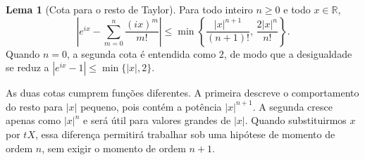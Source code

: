 \documentclass[12pt,portuguese]{article}
\theoremstyle{definition}
\newtheorem{lemma}[lemma]{Lema}
\theoremstyle{plainexercise}
\theoremstyle{starredexercise}
\theoremstyle{definition}
\begin{document}
\begin{lemma}[Cota para o resto de Taylor]\label{lem:resto-taylor}
\label{lem:man-resto-taylor}
Para todo inteiro $n\geqslant0$ e todo $x\in\mathbb{R}$,
\[
\left|e^{ix}-\sum_{m=0}^n\frac{(ix)^m}{m!}\right|
\leqslant
\min\left\{
\frac{|x|^{n+1}}{(n+1)!},\,
\frac{2|x|^n}{n!}
\right\}.
\]
Quando $n=0$, a segunda cota é entendida como $2$, de modo que
a desigualdade se reduz a $|e^{ix}-1|\leqslant\min\{|x|,2\}$.
\end{lemma}

As duas cotas cumprem funções diferentes. A primeira descreve o
comportamento do resto para $|x|$ pequeno, pois contém a potência
$|x|^{n+1}$. A segunda cresce apenas como $|x|^n$ e será útil para
valores grandes de $|x|$. Quando substituirmos $x$ por $tX$, essa
diferença permitirá trabalhar sob uma hipótese de momento de
ordem $n$, sem exigir o momento de ordem $n+1$.
\end{document}
